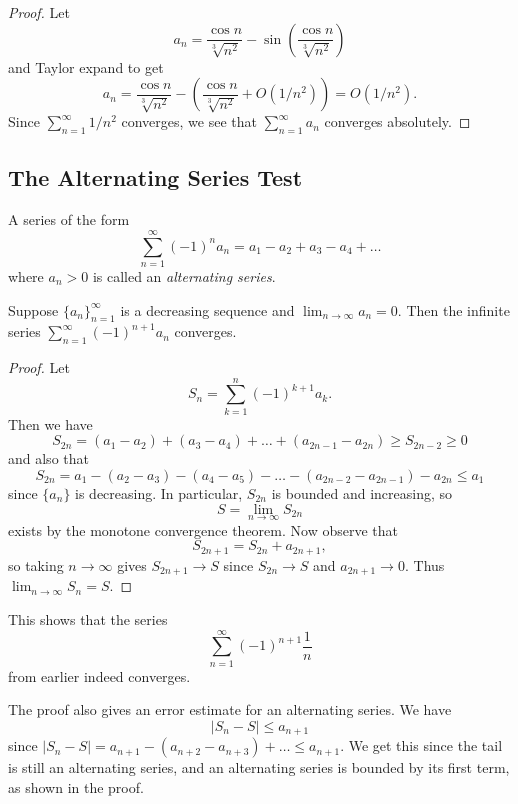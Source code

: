 \begin{proof}
  Let
  \[
    a_n = 
    \frac{\cos n}{\sqrt[3]{n^2}} - \sin\left(\frac{\cos n}{\sqrt[3]{n^2}}\right)
  \]
  and Taylor expand to get
  \[
    a_n = \frac{\cos n}{\sqrt[3]{n^2}} - \left(\frac{\cos n}{\sqrt[3]{n^2}} + O(1 / n^2)\right)
    = O(1 / n^2).
  \]
  Since $\sum_{n = 1}^\infty 1 / n^2$ converges, we see
  that $\sum_{n = 1}^\infty a_n$ converges absolutely.
\end{proof}

\subsection{The Alternating Series Test}
\begin{definition}
  A series of the form
  \[
    \sum_{n = 1}^\infty (-1)^n a_n
    = a_1 - a_2 + a_3 - a_4 + \dots
  \]
  where $a_n > 0$ is called an \emph{alternating series}.
\end{definition}

\begin{theorem}
  Suppose $\{a_n\}_{n = 1}^\infty$ is a decreasing
  sequence and $\lim_{n \to \infty} a_n = 0$. Then
  the infinite series $\sum_{n = 1}^\infty (-1)^{n + 1} a_n$
  converges.
\end{theorem}

\begin{proof}
  Let
  \[
    S_n = \sum_{k = 1}^n (-1)^{k + 1} a_k.
  \]
  Then we have
  \[
    S_{2n} = (a_1 - a_2) + (a_3 - a_4) + \dots + (a_{2n - 1} - a_{2n})
    \ge S_{2n - 2} \ge 0
  \]
  and also that
  \[
    S_{2n} = a_1 - (a_2 - a_3) - (a_4 - a_5) - \dots - (a_{2n - 2} - a_{2n - 1}) - a_{2n} \le a_1
  \]
  since $\{a_n\}$ is decreasing. In particular,
  $S_{2n}$ is bounded and increasing, so
  \[
    S = \lim_{n \to \infty} S_{2n}
  \]
  exists by the monotone convergence theorem. Now
  observe that
  \[
    S_{2n + 1} = S_{2n} + a_{2n + 1},
  \]
  so taking $n \to \infty$ gives
  $S_{2n + 1} \to S$ since $S_{2n} \to S$ and
  $a_{2n + 1} \to 0$. Thus $\lim_{n \to \infty} S_n = S$.
\end{proof}

\begin{remark}
  This shows that the series
  \[
    \sum_{n = 1}^\infty (-1)^{n + 1} \frac{1}{n}
  \]
  from earlier indeed converges.
\end{remark}

\begin{remark}
  The proof also gives an error estimate for an
  alternating series. We have
  \[
    |S_n - S| \le a_{n + 1}
  \]
  since
  $|S_n - S| = a_{n + 1} - (a_{n + 2} - a_{n + 3}) + \dots
    \le a_{n + 1}$.
  We get this since the tail is still an alternating
  series, and an alternating series is bounded by its
  first term, as shown in the proof.
\end{remark}
